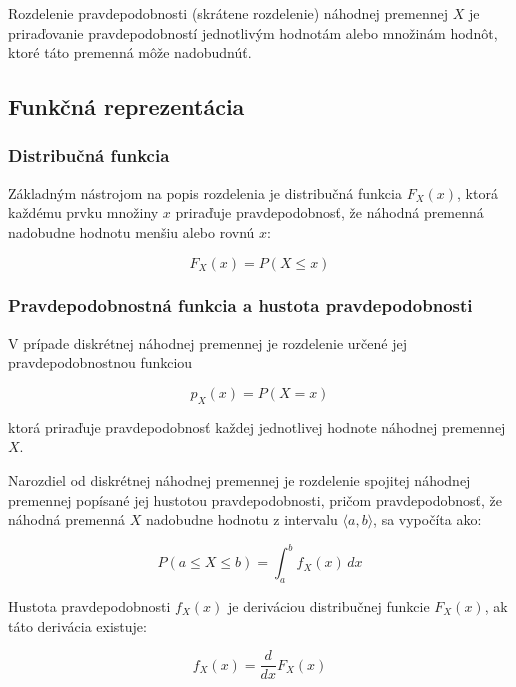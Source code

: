 Rozdelenie pravdepodobnosti (skrátene rozdelenie) náhodnej premennej $X$ je priraďovanie pravdepodobností jednotlivým hodnotám alebo množinám hodnôt, ktoré táto premenná môže nadobudnúť.

\subsection{Funkčná reprezentácia}

\subsubsection{Distribučná funkcia}

Základným nástrojom na popis rozdelenia je distribučná funkcia $F_X(x)$, ktorá každému prvku množiny $x$ priraďuje pravdepodobnosť, že náhodná premenná nadobudne hodnotu menšiu alebo rovnú $x$: 

\begin{equation} 
F_X(x) = P(X \leq x) 
\end{equation} 

\subsubsection{Pravdepodobnostná funkcia a hustota pravdepodobnosti}

V prípade diskrétnej náhodnej premennej je rozdelenie určené jej pravdepodobnostnou funkciou 

\begin{equation} 
p_X(x) = P(X = x) 
\end{equation} 

ktorá priraďuje pravdepodobnosť každej jednotlivej hodnote náhodnej premennej $X$.

Narozdiel od diskrétnej náhodnej premennej je rozdelenie spojitej náhodnej premennej popísané jej hustotou pravdepodobnosti, pričom pravdepodobnosť, že náhodná premenná $X$ nadobudne hodnotu z intervalu $\langle a, b \rangle$, sa vypočíta ako: 

\begin{equation}
P(a \leq X \leq b) = \int_{a}^{b} f_X(x) \, dx 
\end{equation}

Hustota pravdepodobnosti $f_X(x)$ je deriváciou distribučnej funkcie $F_X(x)$, ak táto derivácia existuje: 

\begin{equation} 
f_X(x) = \frac{d}{dx} F_X(x) 
\end{equation}

